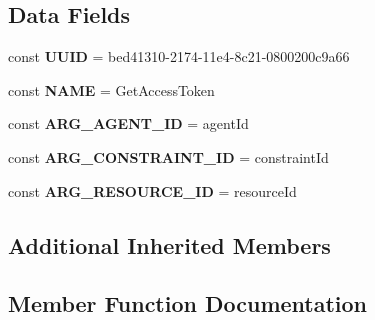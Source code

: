 \subsection*{Data Fields}
\begin{DoxyCompactItemize}
\item 
\hypertarget{class_able_polecat___command___get_access_token_a74b892c8c0b86bf9d04c5819898c51e7}{}const {\bfseries U\+U\+I\+D} = \textquotesingle{}bed41310-\/2174-\/11e4-\/8c21-\/0800200c9a66\textquotesingle{}\label{class_able_polecat___command___get_access_token_a74b892c8c0b86bf9d04c5819898c51e7}

\item 
\hypertarget{class_able_polecat___command___get_access_token_a244352f035b82b20b0efa506167fd862}{}const {\bfseries N\+A\+M\+E} = \textquotesingle{}Get\+Access\+Token\textquotesingle{}\label{class_able_polecat___command___get_access_token_a244352f035b82b20b0efa506167fd862}

\item 
\hypertarget{class_able_polecat___command___get_access_token_ace4b6a947d8491f426397cdc61e06d46}{}const {\bfseries A\+R\+G\+\_\+\+A\+G\+E\+N\+T\+\_\+\+I\+D} = \textquotesingle{}agent\+Id\textquotesingle{}\label{class_able_polecat___command___get_access_token_ace4b6a947d8491f426397cdc61e06d46}

\item 
\hypertarget{class_able_polecat___command___get_access_token_ae5b2d9ff704e78aaba2ee4135090d339}{}const {\bfseries A\+R\+G\+\_\+\+C\+O\+N\+S\+T\+R\+A\+I\+N\+T\+\_\+\+I\+D} = \textquotesingle{}constraint\+Id\textquotesingle{}\label{class_able_polecat___command___get_access_token_ae5b2d9ff704e78aaba2ee4135090d339}

\item 
\hypertarget{class_able_polecat___command___get_access_token_ad7c644bbc85a6e3f9fb11860a4bbcbff}{}const {\bfseries A\+R\+G\+\_\+\+R\+E\+S\+O\+U\+R\+C\+E\+\_\+\+I\+D} = \textquotesingle{}resource\+Id\textquotesingle{}\label{class_able_polecat___command___get_access_token_ad7c644bbc85a6e3f9fb11860a4bbcbff}

\end{DoxyCompactItemize}
\subsection*{Additional Inherited Members}


\subsection{Member Function Documentation}
\hypertarget{class_able_polecat___command___get_access_token_a674eb8d41b003dc1c17e4296a8c9e9f8}{}
